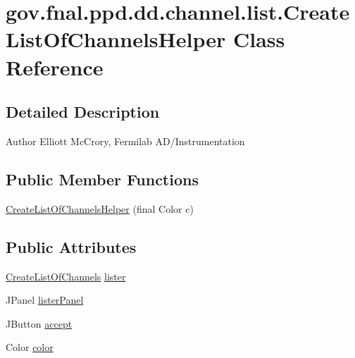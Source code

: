 \hypertarget{classgov_1_1fnal_1_1ppd_1_1dd_1_1channel_1_1list_1_1CreateListOfChannelsHelper}{\section{gov.\-fnal.\-ppd.\-dd.\-channel.\-list.\-Create\-List\-Of\-Channels\-Helper Class Reference}
\label{classgov_1_1fnal_1_1ppd_1_1dd_1_1channel_1_1list_1_1CreateListOfChannelsHelper}
}


\subsection{Detailed Description}
\begin{DoxyAuthor}{Author}
Elliott Mc\-Crory, Fermilab A\-D/\-Instrumentation 
\end{DoxyAuthor}
\subsection*{Public Member Functions}
\begin{DoxyCompactItemize}
\item 
\hyperlink{classgov_1_1fnal_1_1ppd_1_1dd_1_1channel_1_1list_1_1CreateListOfChannelsHelper_ae6e38ebb57b0247c93a546f613fce2c8}{Create\-List\-Of\-Channels\-Helper} (final Color c)
\end{DoxyCompactItemize}
\subsection*{Public Attributes}
\begin{DoxyCompactItemize}
\item 
\hyperlink{classgov_1_1fnal_1_1ppd_1_1dd_1_1channel_1_1list_1_1CreateListOfChannels}{Create\-List\-Of\-Channels} \hyperlink{classgov_1_1fnal_1_1ppd_1_1dd_1_1channel_1_1list_1_1CreateListOfChannelsHelper_ad9a55e586ea2b5d8775ec9b9bafbc8bf}{lister}
\item 
J\-Panel \hyperlink{classgov_1_1fnal_1_1ppd_1_1dd_1_1channel_1_1list_1_1CreateListOfChannelsHelper_af7f5d450eff8fc117d70ddd5e0621308}{lister\-Panel}
\item 
J\-Button \hyperlink{classgov_1_1fnal_1_1ppd_1_1dd_1_1channel_1_1list_1_1CreateListOfChannelsHelper_a9ee26ae63feb90e8fbf691e14b94ddec}{accept}
\item 
Color \hyperlink{classgov_1_1fnal_1_1ppd_1_1dd_1_1channel_1_1list_1_1CreateListOfChannelsHelper_aa374f73b8da23d1ff27a3faad1a1f678}{color}
\end{DoxyCompactItemize}


